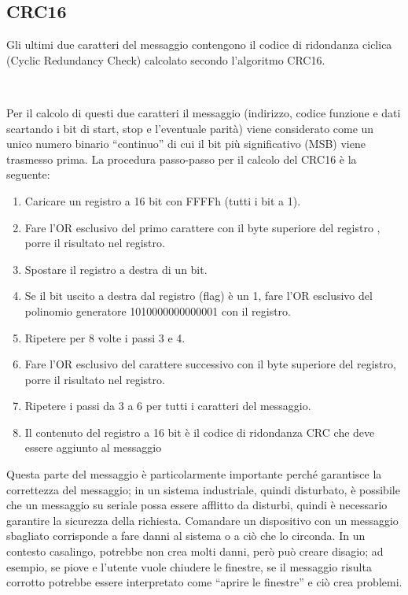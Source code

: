 \documentclass[a4paper,titlepage]{book}
\begin{document}
\subsection{CRC16}

Gli ultimi due caratteri del messaggio contengono il codice di ridondanza ciclica (Cyclic Redundancy Check) calcolato secondo l'algoritmo CRC16.

~

Per il calcolo di questi due caratteri il messaggio (indirizzo, codice funzione e dati scartando i bit di start, stop e l'eventuale parità) viene considerato come un unico numero binario ``continuo'' di cui il bit più significativo (MSB) viene trasmesso prima. La procedura passo-passo per il calcolo del CRC16 è la seguente:

\begin{enumerate}[noitemsep,topsep=15pt,parsep=10pt,partopsep=0pt]

\item Caricare un registro a 16 bit con FFFFh (tutti i bit a 1).
\item Fare l'OR esclusivo del primo carattere con il byte superiore del registro , porre il risultato nel registro.
\item Spostare il registro a destra di un bit.
\item Se il bit uscito a destra dal registro (flag) è un 1, fare l'OR esclusivo del polinomio generatore 1010000000000001 con il registro.
\item Ripetere per 8 volte i passi 3 e 4.
\item Fare l'OR esclusivo del carattere successivo con il byte superiore del registro, porre il risultato nel registro.
\item Ripetere i passi da 3 a 6 per tutti i caratteri del messaggio.
\item Il contenuto del registro a 16 bit è il codice di ridondanza CRC che deve essere aggiunto al messaggio

\end{enumerate}

Questa parte del messaggio è particolarmente importante perché garantisce la correttezza del messaggio; in un sistema industriale, quindi disturbato, è possibile che un messaggio su seriale possa essere afflitto da disturbi, quindi è necessario garantire la sicurezza della richiesta. Comandare un dispositivo con un messaggio sbagliato corrisponde a fare danni al sistema o a ciò che lo circonda. In un contesto casalingo, potrebbe non crea molti danni, però può creare disagio; ad esempio, se piove e l'utente vuole chiudere le finestre, se il messaggio risulta corrotto potrebbe essere interpretato come ``aprire le finestre'' e ciò crea problemi.
\end{document}
